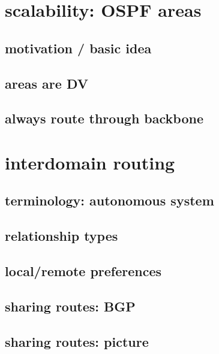 \section{scalability: OSPF areas} %

\subsection{motivation / basic idea}



\subsection{areas are DV}



\subsection{always route through backbone}


\section{interdomain routing}


\subsection{terminology: autonomous system}


\subsection{relationship types}


\subsection{local/remote preferences}


\subsection{sharing routes: BGP}


\subsection{sharing routes: picture}


